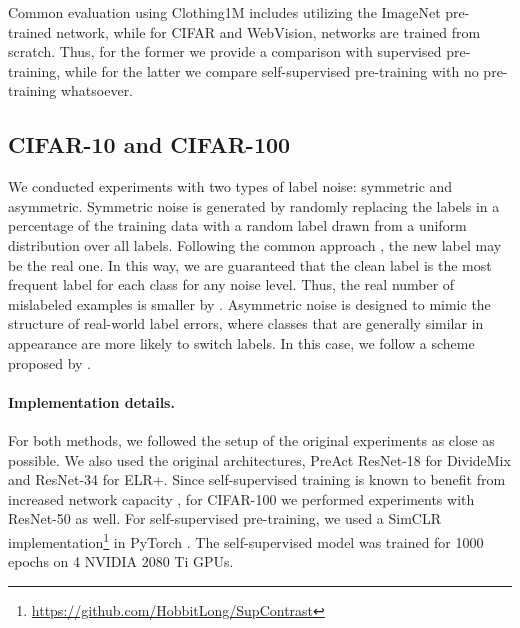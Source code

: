 \documentclass[10pt,twocolumn,letterpaper]{article}
\renewcommand{\cite}[1]{\citep{#1}}
\begin{document}
Common evaluation using Clothing1M includes utilizing the ImageNet pre-trained network, while for CIFAR and WebVision, networks are trained from scratch. Thus, for the former we provide a comparison with supervised pre-training, while for the latter we compare self-supervised pre-training with no pre-training whatsoever.

\subsection{CIFAR-10 and CIFAR-100}
\label{subsec:cifar_exp}

We conducted experiments with two types of label noise: symmetric and asymmetric. 
Symmetric noise is generated by randomly replacing the
labels in a percentage of the training data with a random label drawn from a uniform distribution over all labels. 
Following the common approach \cite{zhang2016understanding,arazo2019mcorr,li2020dividemix}, the new label may be the real one. In this way, we are guaranteed that the clean label is the most frequent label for each class for any noise level. Thus, the real number of mislabeled examples is smaller by . 
Asymmetric noise is designed to mimic the structure of real-world label errors, where classes that are generally similar in appearance are more likely to switch labels. In this case, we follow a scheme proposed by \citet{patrini2017making}. 

\paragraph{Implementation details.}
For both methods, we followed the setup of the original experiments as close as possible. We also used the original architectures,   PreAct ResNet-18 \cite{he2015deep} for DivideMix and ResNet-34 for ELR+. Since self-supervised training is known to benefit from increased network capacity \cite{henaff2019cpc2, chen2020simclr}, for CIFAR-100 we performed experiments with ResNet-50 as well.
For self-supervised pre-training, we used a SimCLR implementation\footnote{\url{https://github.com/HobbitLong/SupContrast}} in PyTorch \cite{paszke2019pytorch}. The self-supervised model was trained for 1000 epochs on 4 NVIDIA 2080 Ti GPUs.
\end{document}
